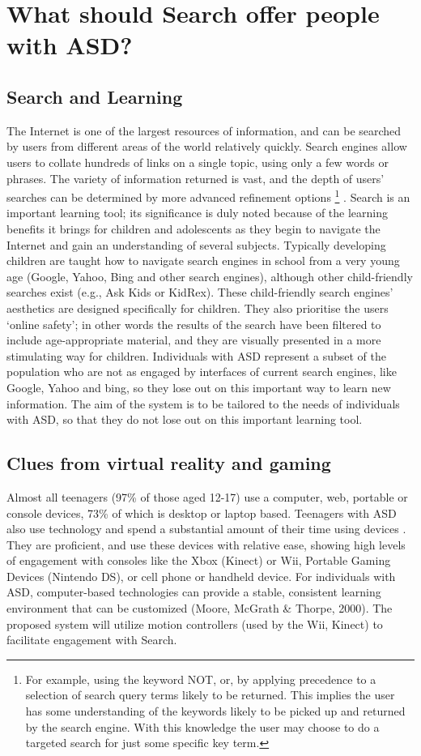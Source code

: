 \documentclass[10pt]{article}
\begin{document}
\section{What should Search offer people with ASD?}\label{What should Search offer people with ASD}
\subsection{Search and Learning}
The Internet is one of the largest resources of information, and can be searched by users from different areas of the world relatively quickly. Search engines allow users to collate hundreds of links on a single topic, using only a few words or phrases. The variety of information returned is vast, and the depth of users’ searches can be determined by more advanced refinement options \footnote{For example, using the keyword NOT, or, by applying precedence to a selection of search query terms likely to be returned. This implies the user has some understanding of the keywords likely to be picked up and returned by the search engine. With this knowledge the user may choose to do a targeted search for just some specific key term.} . Search is an important learning tool; its significance is duly noted because of the learning benefits it brings for children and adolescents as they begin to navigate the Internet and gain an understanding of several subjects. 
Typically developing children are taught how to navigate search engines in school from a very young age (Google, Yahoo, Bing and other search engines), although other child-friendly searches exist (e.g., Ask Kids or KidRex). These child-friendly search engines’ aesthetics are designed specifically for children. They also prioritise the users ‘online safety’; in other words the results of the search have been filtered to include age-appropriate material, and they are visually presented in a more stimulating way for children.  Individuals with ASD represent a subset of the population who are not as engaged by interfaces of current search engines, like Google, Yahoo and bing, so they lose out on this important way to learn new information. The aim of the system is to be tailored to the needs of individuals with ASD, so that they do not lose out on this important learning tool.

\subsection{Clues from virtual reality and gaming}
Almost all teenagers (97\% of those aged 12-17) use a computer, web, portable or console devices, 73\% of which is desktop or laptop based. Teenagers with ASD also use technology and spend a substantial amount of their time using devices \cite{Shane and Albert}. They are proficient, and use these devices with relative ease, showing high levels of engagement with consoles like the Xbox (Kinect) or Wii, Portable Gaming Devices (Nintendo DS), or cell phone or handheld device. For individuals with ASD, computer-based technologies can provide a stable, consistent learning environment that can be customized (Moore, McGrath \& Thorpe, 2000). The proposed system will utilize motion controllers (used by the Wii, Kinect) to facilitate engagement with Search. 
\end{document}
